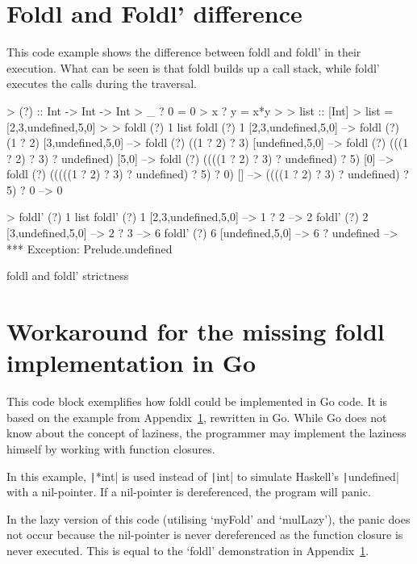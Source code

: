 \section{Foldl and Foldl' difference}\label{appendix:foldl-strictness}

This code example shows the difference between foldl and foldl' in their
execution. What can be seen is that foldl builds up a call stack, while
foldl' executes the calls during the traversal.

\begin{code}
    \begin{haskellcode}
> (?) :: Int -> Int -> Int
> _ ? 0 = 0
> x ? y = x*y
>
> list :: [Int]
> list = [2,3,undefined,5,0]
>
> foldl (?) 1 list
foldl (?) 1 [2,3,undefined,5,0] -->
foldl (?) (1 ? 2) [3,undefined,5,0] -->
foldl (?) ((1 ? 2) ? 3) [undefined,5,0] -->
foldl (?) (((1 ? 2) ? 3) ? undefined) [5,0] -->
foldl (?) ((((1 ? 2) ? 3) ? undefined) ? 5) [0] -->
foldl (?) (((((1 ? 2) ? 3) ? undefined) ? 5) ? 0) [] -->
((((1 ? 2) ? 3) ? undefined) ? 5) ? 0 -->
0

> foldl' (?) 1 list
foldl' (?) 1 [2,3,undefined,5,0] -->
    1 ? 2 --> 2
foldl' (?) 2 [3,undefined,5,0] -->
    2 ? 3 --> 6
foldl' (?) 6 [undefined,5,0] -->
    6 ? undefined -->
*** Exception: Prelude.undefined
    \end{haskellcode}
    \caption{foldl and foldl' strictness\autocite{fold-types}}
\end{code}

\section{Workaround for the missing foldl implementation in Go}\label{appendix:foldl-go}

This code block exemplifies how foldl could be implemented in Go code. It is based on the example
from Appendix~\ref{appendix:foldl-strictness}, rewritten in Go. While Go does not know about
the concept of laziness, the programmer may implement the laziness himself by working with function
closures.

In this example, \texttt|*int| is used instead of \texttt|int| to simulate Haskell's
\texttt|undefined| with a nil-pointer.
If a nil-pointer is dereferenced, the program will panic.

In the lazy version of this code (utilising `myFold' and `mulLazy'), the panic does not occur because
the nil-pointer is never dereferenced as the function closure is never executed. This is equal
to the `foldl' demonstration in Appendix~\ref{appendix:foldl-strictness}.

